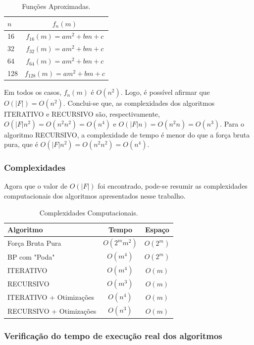 \begin{table}[h]
\centering
\caption[Funções Aproximadas]
{Funções Aproximadas.}
\label{table:funcoes}
\begin{tabular}{lc}
\hline
$n$ & $f_n(m)$\\ \hline
16  & $f_{16}(m) = am^2 + bm + c$\\
32  & $f_{32}(m) = am^2 + bm + c$\\
64  & $f_{64}(m) = am^2 + bm + c$\\
128 & $f_{128}(m) = am^2 + bm + c$\\
\end{tabular}
\end{table}

Em todos os casos, $f_n(m)$ é $O(n^2)$. Logo, é possível afirmar que $O(|F|)=O(n^2)$. Conclui-se que, as complexidades dos algoritmos ITERATIVO e RECURSIVO são, respectivamente, $O(|F|n^2) = O(n^2n^2) = O(n^4)$ e $O(|F|n) = O(n^2n) = O(n^3)$. Para o algoritmo RECURSIVO, a complexidade de tempo é menor do que a força bruta pura, que é $O(|F|n^2) = O(n^2n^2) = O(n^4)$. 

\subsubsection{Complexidades}

Agora que o valor de $O(|F|)$ foi encontrado, pode-se resumir as complexidades computacionais dos algoritmos apresentados nesse trabalho.

\begin{table}[h]
\centering
\caption[Complexidades Computacionais]
{Complexidades Computacionais.}
\label{table:complexidade}
\begin{tabular}{lcc}
\hline
Algoritmo & Tempo & Espaço\\ \hline
Força Bruta Pura & $O(2^mm^2)$ & $O(2^m)$\\
BP com "Poda" & $O(m^4)$ & $O(2^m)$\\
ITERATIVO & $O(m^4)$ & $O(m)$\\
RECURSIVO & $O(m^3)$ & $O(m)$\\
ITERATIVO + Otimizações & $O(n^4)$ & $O(m)$\\
RECURSIVO + Otimizações & $O(n^3)$ & $O(m)$\\
\end{tabular}
\end{table}

\subsubsection{Verificação do tempo de execução real dos algoritmos}


